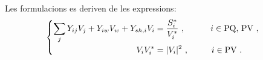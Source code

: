 Les formulacions es deriven de les expressions:
\begin{equation} %
\begin{cases}
    \begin{split}
        \sum_{j} Y_{ij}V_j+Y_{iw}V_w+Y_{sh,i}V_i&=\frac{S^*_i}{V^*_i}\ , \hspace{30pt} i\in \text{PQ, PV}\ ,\\
        V_iV^*_i&=|V_i|^2\ , \hspace{27.0pt} i\in \text{PV}\ .
    \end{split}
\end{cases}
\label{eq:2eq}
\end{equation}
